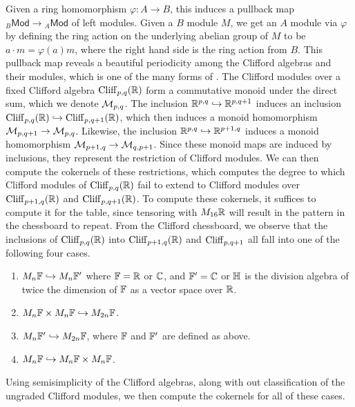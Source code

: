 Given a ring homomorphism $\varphi : A \to B$, this induces a pullback map
${}_B\mathsf{Mod} \to {}_A\mathsf{Mod}$ of left modules. Given a $B$ module $M$,
we get an $A$ module via $\varphi$ by defining the ring action on the underlying
abelian group of $M$ to be $a \cdot m = \varphi(a)m$, where the right hand side
is the ring action from $B$. This pullback map reveals a beautiful periodicity
among the Clifford algebras and their modules, which is one of the many forms
of . The Clifford modules over a fixed Clifford algebra
$\operatorname{Cliff}_{p,q}(\mathbb{R})$ form a commutative monoid under the direct sum, which
we denote $\mathcal{M}_{p,q}$. The inclusion $\mathbb{R}^{p,q} \hookrightarrow \mathbb{R}^{p,q+1}$ induces
an inclusion $\operatorname{Cliff}_{p,q}(\mathbb{R}) \hookrightarrow \operatorname{Cliff}_{p,q+1}(\mathbb{R})$, which then
induces a monoid homomorphism $\mathcal{M}_{p,q+1} \to \mathcal{M}_{p,q}$. Likewise, the inclusion
$\mathbb{R}^{p,q}\hookrightarrow \mathbb{R}^{p+1,q}$ induces a monoid homomorphism
$\mathcal{M}_{p+1,q} \to \mathcal{M}_{q,p+1}$. Since these monoid maps are induced by
inclusions, they represent the restriction of Clifford modules. We can then
compute the cokernels of these restrictions, which computes the degree to
which Clifford modules of $\operatorname{Cliff}_{p,q}(\mathbb{R})$ fail to extend to Clifford modules
over $\operatorname{Cliff}_{p+1,q}(\mathbb{R})$ and $\operatorname{Cliff}_{p,q+1}(\mathbb{R})$. To compute these cokernels,
it suffices to compute it for the table, since tensoring with $M_{16}\mathbb{R}$ will
result in the pattern in the chessboard to repeat. From the Clifford chessboard,
we observe that the inclusions of $\operatorname{Cliff}_{p,q}(\mathbb{R})$ into $\operatorname{Cliff}_{p+1,q}(\mathbb{R})$
and $\operatorname{Cliff}_{p,q+1}$ all fall into one of the following four cases.
%
\begin{enumerate}
  \item $M_n\mathbb{F} \hookrightarrow M_n\mathbb{F}'$ where $\mathbb{F} = \mathbb{R}$ or $\mathbb{C}$, and $\mathbb{F}' = \mathbb{C}$
  or $\mathbb{H}$ is the division algebra of twice the dimension of $\mathbb{F}$ as a
  vector space over $\mathbb{R}$.
  \item $M_n\mathbb{F} \times M_n\mathbb{F} \hookrightarrow M_{2n}\mathbb{F}$.
  \item $M_n\mathbb{F}' \hookrightarrow M_{2n}\mathbb{F}$, where $\mathbb{F}$ and $\mathbb{F}'$ are defined as above.
  \item $M_n\mathbb{F} \hookrightarrow M_n\mathbb{F} \times M_n\mathbb{F}$.
\end{enumerate}
%
Using semisimplicity of the Clifford algebras, along with out classification of
the ungraded Clifford modules, we then compute the cokernels for all of these
cases.
%
